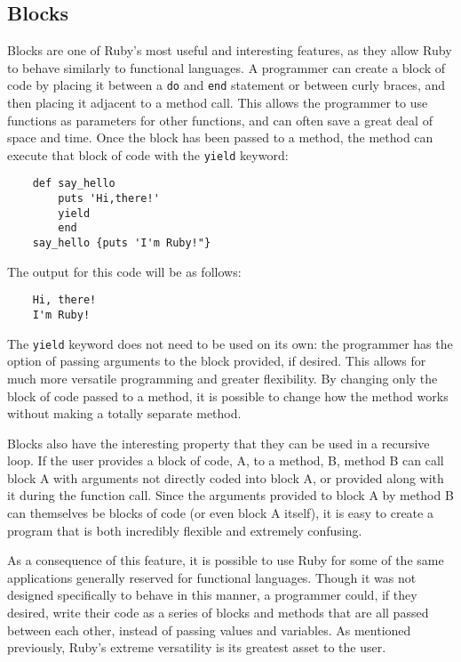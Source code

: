 \documentclass[12pt]{article}
\begin{document}
\subsection{Blocks}
Blocks are one of Ruby's most useful and interesting features, as they allow Ruby to behave similarly to functional languages. A programmer can create a block of code by placing it between a \verb|do| and \verb|end| statement or between curly braces, and then placing it adjacent to a method call. This allows the programmer to use functions as parameters for other functions, and can often save a great deal of space and time.
Once the block has been passed to a method, the method can execute that block of code with the \verb|yield| keyword:
\begin {lstlisting}
	def say_hello
		puts 'Hi,there!'
    	yield
    	end
	say_hello {puts 'I'm Ruby!"}
\end{lstlisting}
The output for this code will be as follows:
\begin{verbatim}
    Hi, there!
    I'm Ruby!
\end{verbatim}
The \verb|yield| keyword does not need to be used on its own: the programmer has the option of passing arguments to the block provided, if desired. This allows for much more versatile programming and greater flexibility. By changing only the block of code passed to a method, it is possible to change how the method works without making a totally separate method.

Blocks also have the interesting property that they can be used in a recursive loop. If the user provides a block of code, A, to a method, B, method B can call block A with arguments not directly coded into block A, or provided along with it during the function call. Since the arguments provided to block A by method B can themselves be blocks of code (or even block A itself), it is easy to create a program that is both incredibly flexible and extremely confusing.

As a consequence of this feature, it is possible to use Ruby for some of the same applications generally reserved for functional languages. Though it was not designed specifically to behave in this manner, a programmer could, if they desired, write their code as a series of blocks and methods that are all passed between each other, instead of passing values and variables. As mentioned previously, Ruby's extreme versatility is its greatest asset to the user.
\end{document}

